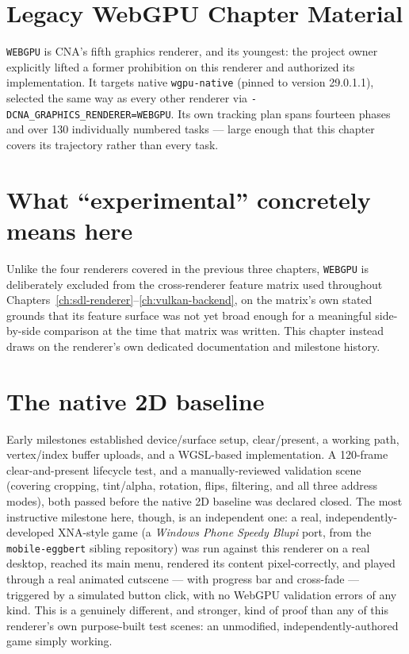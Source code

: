 \section{Legacy WebGPU Chapter Material}
\label{ch:webgpu-backend}

\texttt{WEBGPU} is CNA's fifth graphics renderer, and its youngest: the project owner
explicitly lifted a former prohibition on this renderer and authorized its implementation.
It targets native \texttt{wgpu-native} (pinned to version 29.0.1.1), selected the same way
as every other renderer via \texttt{-DCNA\_GRAPHICS\_RENDERER=WEBGPU}. Its own tracking plan
spans fourteen phases and over 130 individually numbered tasks --- large enough that this
chapter covers its trajectory rather than every task.

\section{What ``experimental'' concretely means here}

Unlike the four renderers covered in the previous three chapters, \texttt{WEBGPU} is
deliberately excluded from the cross-renderer feature matrix used throughout
Chapters~\ref{ch:sdl-renderer}--\ref{ch:vulkan-backend}, on the matrix's own stated grounds
that its feature surface was not yet broad enough for a meaningful side-by-side comparison at
the time that matrix was written. This chapter instead draws on the renderer's own dedicated
documentation and milestone history.

\section{The native 2D baseline}

Early milestones established device/surface setup, clear/present, a working
 path, vertex/index buffer uploads, and a WGSL-based
 implementation. A 120-frame clear-and-present lifecycle test, and a
manually-reviewed  validation scene (covering cropping, tint/alpha,
rotation, flips, filtering, and all three address modes), both passed before the native 2D
baseline was declared closed. The most instructive milestone here, though, is an independent
one: a real, independently-developed XNA-style game (a \emph{Windows Phone Speedy Blupi}
port, from the \texttt{mobile-eggbert} sibling repository) was run against this renderer on a
real desktop, reached its main menu, rendered its  content
pixel-correctly, and played through a real animated cutscene --- with progress bar and
cross-fade --- triggered by a simulated button click, with no WebGPU validation errors of any
kind. This is a genuinely different, and stronger, kind of proof than any of this renderer's
own purpose-built test scenes: an unmodified, independently-authored game simply working.

